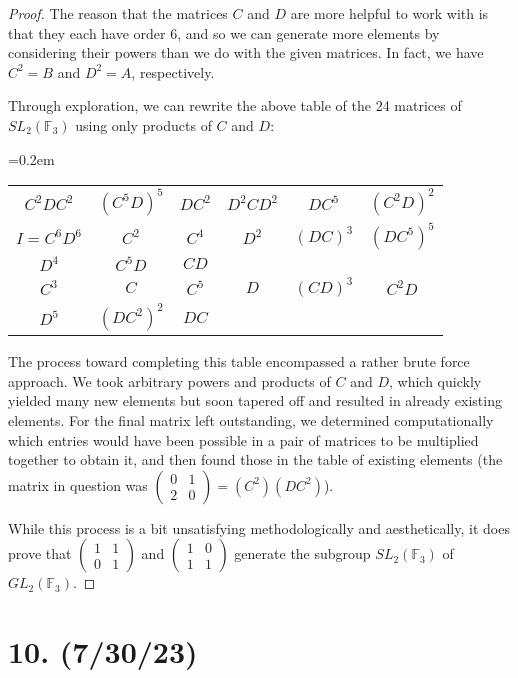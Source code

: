 \documentclass{article}
\begin{document}
\begin{proof}
    The reason that the matrices $C$ and $D$ are more helpful to work with is that they each have order 6, and so we can generate more elements by considering their powers than we do with the given matrices. In fact, we have $C^2 = B$ and $D^2 = A$, respectively.

    Through exploration, we can rewrite the above table of the 24 matrices of $SL_2(\mathbb{F}_3)$ using only products of $C$ and $D$:

    \begin{center}
        {\tabulinesep=0.2em
        \begin{tabu}{cccccc}
            $C^2 D C^2$ & $(C^5 D)^5$ & $DC^2$ & $D^2 C D^2$ & $DC^5$ & $(C^2 D)^2$ \\
            $I = C^6 D^6$ & $C^2$ & $C^4$ & $D^2$ & $(DC)^3$ & $(DC^5)^5$ \\
            $D^4$ & $C^5 D$ & $CD$ \\
            $C^3$ & $C$ & $C^5$ & $D$ & $(CD)^3$ & $C^2 D$ \\
            $D^5$ & $(DC^2)^2$ & $DC$
        \end{tabu} }
    \end{center}

    The process toward completing this table encompassed a rather brute force approach. We took arbitrary powers and products of $C$ and $D$, which quickly yielded many new elements but soon tapered off and resulted in already existing elements. For the final matrix left outstanding, we determined computationally which entries would have been possible in a pair of matrices to be multiplied together to obtain it, and then found those in the table of existing elements (the matrix in question was $\begin{pmatrix}0 & 1 \\ 2 & 0\end{pmatrix} = (C^2) (D C^2)$).

    While this process is a bit unsatisfying methodologically and aesthetically, it does prove that $\begin{pmatrix}1 & 1 \\ 0 & 1\end{pmatrix}$ and $\begin{pmatrix}1 & 0 \\ 1 & 1\end{pmatrix}$ generate the subgroup $SL_2(\mathbb{F}_3)$ of $GL_2(\mathbb{F}_3)$.
\end{proof}

\section*{10. (7/30/23)}
\end{document}
